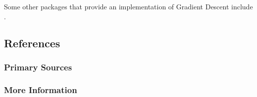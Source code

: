 Some other packages that provide an implementation of Gradient Descent include .


\subsection{References}

\subsubsection{Primary Sources}


\subsubsection{More Information}




